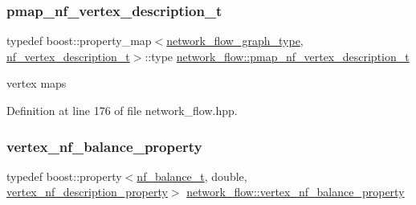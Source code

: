 \mbox{\label{classnetwork__flow_a74ecf4431065049cd8c880b82b2b1a2c}} 
\subsubsection{\texorpdfstring{pmap\+\_\+nf\+\_\+vertex\+\_\+description\+\_\+t}{pmap\_nf\_vertex\_description\_t}}
{\footnotesize\ttfamily typedef boost\+::property\+\_\+map$<$\hyperlink{classnetwork__flow_abfdb8d1baba183c2b121f8c078b9b640}{network\+\_\+flow\+\_\+graph\+\_\+type}, \hyperlink{structnetwork__flow_1_1nf__vertex__description__t}{nf\+\_\+vertex\+\_\+description\+\_\+t}$>$\+::type \hyperlink{classnetwork__flow_a74ecf4431065049cd8c880b82b2b1a2c}{network\+\_\+flow\+::pmap\+\_\+nf\+\_\+vertex\+\_\+description\+\_\+t}\hspace{0.3cm}{\ttfamily [private]}}



vertex maps 



Definition at line 176 of file network\+\_\+flow.\+hpp.

\mbox{\label{classnetwork__flow_a909dd9bc4e908f48724ce22b849b97e8}} 
\subsubsection{\texorpdfstring{vertex\+\_\+nf\+\_\+balance\+\_\+property}{vertex\_nf\_balance\_property}}
{\footnotesize\ttfamily typedef boost\+::property$<$\hyperlink{structnetwork__flow_1_1nf__balance__t}{nf\+\_\+balance\+\_\+t}, double, \hyperlink{classnetwork__flow_afc0f1529b8715e4c4e04599e3c4dc74e}{vertex\+\_\+nf\+\_\+description\+\_\+property}$>$ \hyperlink{classnetwork__flow_a909dd9bc4e908f48724ce22b849b97e8}{network\+\_\+flow\+::vertex\+\_\+nf\+\_\+balance\+\_\+property}\hspace{0.3cm}{\ttfamily [private]}}



